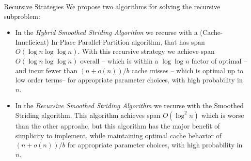 \documentclass[table,serif,mathserif,final]{beamer}
\theoremstyle{remark}
\begin{document}
\begin{frame}{}
\begin{columns}[t]
\begin{column}{0.21\linewidth}
\begin{block}{\Huge Recursive Strategies}
  \justifying
  \Huge We propose two algorithms for solving the recursive subproblem: \\
	\begin{itemize}
    \item In the \emph{Hybrid Smoothed Striding Algorithm} we recurse with a (Cache-Inneficient) In-Place Parallel-Partition algorithm, that has span $O(\log n \log \log n)$. With this recursive strategy we achieve span $O(\log n \log \log n)$ overall -- which is within a $\log\log n$ factor of optimal -- and incur fewer than $(n+o(n))/b$ cache misses -- which is optimal up to low order terms-- for appropriate parameter choices, with high probability in $n$.
    \item In the \emph{Recursive Smoothed Striding Algorithm} we recurse with the Smoothed Striding algorithm. {\color{red}This algorithm achieves span $O(\log^2 n)$ which is worse than the other approahc,} but this algorithm {\color{green} has the major benefit of simplicity to implement, while maintaining optimal cache behavior of $(n+o(n))/b$ for appropriate parameter choices, with high probability in $n$}.
	\end{itemize}
\end{block}
\vspace{1cm}



\vspace{1cm}


\end{column}
\end{columns}
\end{frame}
\end{document}
